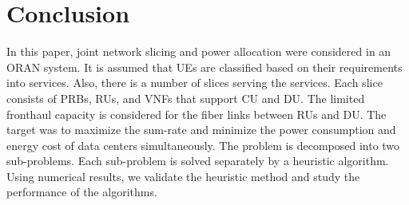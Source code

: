 \documentclass[conference]{IEEEtran}
\begin{document}
\section{Conclusion}
In this paper, joint network slicing and power allocation were considered in an ORAN system. It is assumed that UEs are classified based on their requirements into services. Also, there is a number of slices serving the services. Each slice consists of PRBs, RUs, and VNFs that support CU and DU. The limited fronthaul capacity is considered for the fiber links between RUs and DU.
The target was to maximize the sum-rate and minimize the power consumption and energy cost of data centers simultaneously.
The problem is decomposed into two sub-problems. Each sub-problem is solved separately by a heuristic algorithm. Using numerical results, we validate the heuristic method and study the performance of the algorithms. %




\end{document}
